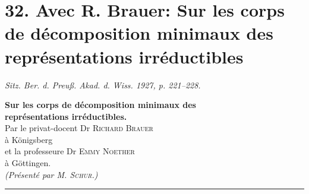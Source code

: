 \setcounter{footnote}{0}

\providecommand{\mS}{\mathfrak S}
\providecommand{\mA}{\mathfrak A}
\providecommand{\mat}[1]{\begin{pmatrix}#1\end{pmatrix}}

\section*{32. Avec R. Brauer: Sur les corps de décomposition minimaux des représentations irréductibles}
\emph{Sitz. Ber. d. Preuß. Akad. d. Wiss. 1927, p. 221--228.}

\begin{center}
{\Large\bfseries Sur les corps de décomposition minimaux des\\
représentations irréductibles.}\\[1.0em]
Par le privat-docent Dr \textsc{Richard Brauer}\\
à Königsberg\\
et la professeure Dr \textsc{Emmy Noether}\\
à Göttingen.\\[0.8em]
\emph{(Présenté par M. \textnormal{\textsc{Schur}}.)}\\[0.5em]
\rule{4em}{0.4pt}
\end{center}

